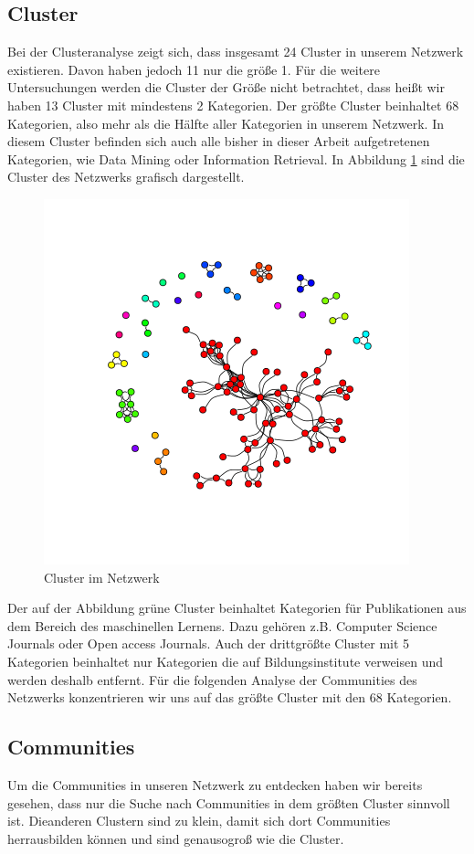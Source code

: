 \documentclass{acm_proc_article-sp}
\begin{document}
\subsection{Cluster}
Bei der Clusteranalyse zeigt sich, dass insgesamt 24 Cluster in unserem Netzwerk existieren. Davon haben jedoch 11 nur die größe 1. Für die weitere Untersuchungen werden die Cluster der Größe nicht betrachtet, dass heißt wir haben 13 Cluster mit mindestens 2 Kategorien.
Der größte Cluster beinhaltet 68 Kategorien, also mehr als die Hälfte aller Kategorien in unserem Netzwerk.
In diesem Cluster befinden sich auch alle bisher in dieser Arbeit aufgetretenen Kategorien, wie Data Mining oder Information Retrieval. In Abbildung \ref{fig:clusters} sind die Cluster des Netzwerks grafisch dargestellt.
\begin{figure}[H]
\centering
\includegraphics[scale=0.55]{../visualization/ml_cluster_graph.png}
\caption{Cluster im Netzwerk}
\label{fig:clusters}
\end{figure}
Der auf der Abbildung grüne Cluster beinhaltet Kategorien für Publikationen aus dem Bereich des maschinellen Lernens. Dazu gehören z.B. Computer Science Journals oder Open access Journals. Auch der drittgrößte Cluster mit 5 Kategorien beinhaltet nur Kategorien die auf Bildungsinstitute verweisen und werden deshalb entfernt. Für die folgenden Analyse der Communities des Netzwerks konzentrieren wir uns auf das größte Cluster mit den 68 Kategorien.
\subsection{Communities}
Um die Communities in unseren Netzwerk zu entdecken haben wir bereits gesehen, dass nur die Suche nach Communities in dem größten Cluster sinnvoll ist. Dieanderen Clustern sind zu klein, damit sich dort Communities herrausbilden können und sind genausogroß wie die Cluster.
\end{document}
